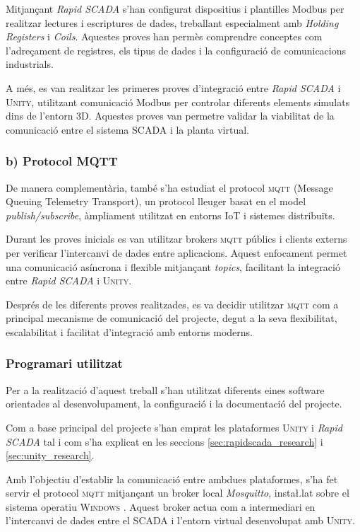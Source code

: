 \documentclass[a4paper,11pt,DIV=13,headings=normal,abstract=true,twoside=semi]{article}
\newcommand{\acro}[1]{\textsc{#1}}
\begin{document}
Mitjançant \emph{Rapid SCADA} s'han configurat dispositius i plantilles Modbus per realitzar lectures i escriptures de dades, treballant especialment amb \emph{Holding Registers} i \emph{Coils}. Aquestes proves han permès comprendre conceptes com l'adreçament de registres, els tipus de dades i la configuració de comunicacions industrials.

A més, es van realitzar les primeres proves d'integració entre \emph{Rapid SCADA} i \acro{Unity}, utilitzant comunicació Modbus per controlar diferents elements simulats dins de l'entorn 3D. Aquestes proves van permetre validar la viabilitat de la comunicació entre el sistema \acro{SCADA} i la planta virtual.

\subsubsection*{b) Protocol MQTT}

De manera complementària, també s'ha estudiat el protocol \acro{mqtt}  \cite{Team2015MQTT,mqtt_unity_guide} (Message Queuing Telemetry Transport), un protocol lleuger basat en el model \emph{publish/subscribe}, àmpliament utilitzat en entorns IoT i sistemes distribuïts.

Durant les proves inicials es van utilitzar brokers \acro{mqtt} públics i clients externs per verificar l'intercanvi de dades entre aplicacions. Aquest enfocament permet una comunicació asíncrona i flexible mitjançant \emph{topics}, facilitant la integració entre \emph{Rapid SCADA} i \acro{Unity}.

Després de les diferents proves realitzades, es va decidir utilitzar \acro{mqtt} com a principal mecanisme de comunicació del projecte, degut a la seva flexibilitat, escalabilitat i facilitat d'integració amb entorns moderns.


\subsubsection{Programari utilitzat}

Per a la realització d'aquest treball s'han utilitzat diferents eines software orientades al desenvolupament, la configuració i la documentació del projecte.

Com a base principal del projecte s'han emprat les plataformes \acro{Unity} i \emph{Rapid SCADA} tal i com s'ha explicat en les seccions  \ref{sec:rapidscada_research} i \ref{sec:unity_research}.

Amb l'objectiu d'establir la comunicació entre ambdues plataformes, s'ha fet servir el protocol \acro{mqtt}  mitjançant un broker local \textit{Mosquitto}, insta\l.lat sobre el sistema operatiu \acro{Windows} \cite{mosquitto_download}. Aquest broker actua com a intermediari en l'intercanvi de dades entre el \acro{SCADA} i l'entorn virtual desenvolupat amb \acro{Unity}.
\end{document}
